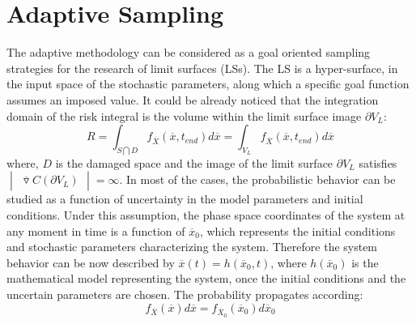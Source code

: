 \documentclass{anstrans}
\begin{document}
\section{Adaptive Sampling}
The  adaptive methodology can be considered as a goal oriented sampling strategies for the research of limit surfaces (LSs). The LS is a hyper-surface, in the input space of the stochastic parameters, along which a specific goal function assumes an imposed value.
It could be already noticed that the integration domain of the risk integral is the volume within the limit surface image $\partial V_{L}$:
\begin{equation}
R=\int_{S\bigcap D} f _{\overline{X}}(\overline{x},t_{end})d\overline{x} =\int_{V_{L}}    f _{\overline{X}}(\overline{x},t_{end})d\overline{x}
\end{equation}
where, $D$ is the damaged space and the image of the limit surface $\partial V_{L}$ satisfies $\begin{vmatrix} \overline{\triangledown} C\left ( \partial V_{L} \right ) \end{vmatrix} = \infty $.
In most of the cases\cite{MathFrameworkMC2013}, the probabilistic behavior can be studied as a function of uncertainty in the model parameters and initial conditions.
Under this assumption, the phase space coordinates of the system at any moment in time is a function of $\overline{x}_{0}$, which represents the initial conditions and stochastic parameters characterizing the system. Therefore the system behavior can be now described by $\overline{x}(t)=h(\overline{x}_{0},t)$, where $h(\overline{x}_{0})$ is the mathematical model representing the system, once the initial conditions and the uncertain parameters are chosen. The probability propagates according:
\begin{equation}
f _{\overline{X}}(\overline{x})d\overline{x} = f _{\overline{X}_{0}}(\overline{x}_{0})d\overline{x}_{0}
\end{equation}
\end{document}
